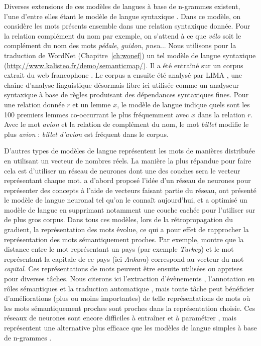 Diverses extensions de ces modèles de langues à base de n-grammes existent,
l'une d'entre elles étant le modèle de langue syntaxique
\citep{lin1998automatic,goldberg2013dataset}. Dans ce modèle, on considère les
mots présents ensemble dans une relation syntaxique donnée. Pour la relation
complément du nom par exemple, on s'attend à ce que \emph{vélo} soit le
complément du nom des mots \emph{pédale}, \emph{guidon}, \emph{pneu}... Nous
utilisons pour la traduction de WordNet (Chapitre~\ref{ch:wonef}) un tel modèle
de langue syntaxique (\url{http://www.kalisteo.fr/demo/semanticmap/}).  Il a
été entraîné sur un corpus extrait du web francophone
\citep{grefenstette2007conquering}. Le corpus a ensuite été analysé par LIMA
\citep{besancon2010lima}, une chaîne d'analyse linguistique désormais libre ici
utilisée comme un analyseur syntaxique à base de règles produisant des
dépendances syntaxiques fines. Pour une relation donnée $r$ et un lemme $x$, le
modèle de langue indique quels sont les 100 premiers lemmes co-occurrant le
plus fréquemment avec $x$ dans la relation $r$.  Avec le mot \textit{avion} et
la relation de complément du nom, le mot \textit{billet} modifie le plus
\textit{avion} : \textit{billet d'avion} est fréquent dans le corpus.



D'autres types de modèles de langue représentent les mots de manières
distribuée en utilisant un vecteur de nombres réels. La manière la plus
répandue pour faire cela est d'utiliser un réseau de neurones dont une des
couches sera le vecteur représentant chaque mot. \cite{hinton1986learning} a
d'abord proposé l'idée d'un réseau de neurones pour représenter des concepts à
l'aide de vecteurs faisant partie du réseau,
\cite{bengio2001neural,bengio2003neural} ont présenté le modèle de langue
neuronal tel qu'on le connaît aujourd'hui, et \cite{mikolov2013efficient} a
optimisé un modèle de langue en supprimant notamment une couche cachée pour
l'utiliser sur de plus gros corpus. Dans tous ces modèles, lors de la
rétropropagation du gradient, la représentation des mots évolue, ce qui a pour
effet de rapprocher la représentation des mots sémantiquement proches. Par
exemple, \cite{mikolov2013distributed} montre que la distance entre le mot
représentant un pays (par exemple \emph{Turkey}) et le mot représentant la
capitale de ce pays (ici \emph{Ankara}) correspond au vecteur du mot
\emph{capital}.  Ces représentations de mots peuvent être ensuite utilisées ou
apprises pour diverses tâches. Nous citerons ici l'extraction d'évènements
\citep{boros2014etiquetage}, l'annotation en rôles sémantiques
\citep{lechelle2014utilisation} et la traduction automatique
\citep{devlin2014fast}, mais toute tâche peut bénéficier d'améliorations (plus
ou moins importantes) de telle représentations de mots où les mots
sémantiquement proches sont proches dans la représentation choisie.  Ces
réseaux de neurones sont encore difficiles à entraîner et à paramétrer
\citep{do2014modeles}, mais représentent une alternative plus efficace que les
modèles de langue simples à base de n-grammes \citep{baroni2014dont}.

